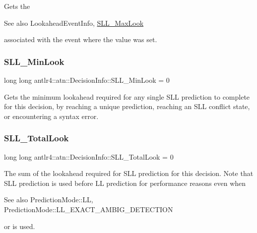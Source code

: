 Gets the \begin{DoxySeeAlso}{See also}
Lookahead\+Event\+Info, \hyperlink{classantlr4_1_1atn_1_1DecisionInfo_a79f953eada792e1239b292a4a2163138}{S\+L\+L\+\_\+\+Max\+Look}


\end{DoxySeeAlso}
associated with the event where the  value was set. \mbox{\label{classantlr4_1_1atn_1_1DecisionInfo_a8ab55352ff7f6a4598f96291377780e8}} 
\subsubsection{\texorpdfstring{S\+L\+L\+\_\+\+Min\+Look}{SLL\_MinLook}}
{\footnotesize\ttfamily long long antlr4\+::atn\+::\+Decision\+Info\+::\+S\+L\+L\+\_\+\+Min\+Look = 0}



Gets the minimum lookahead required for any single S\+LL prediction to complete for this decision, by reaching a unique prediction, reaching an S\+LL conflict state, or encountering a syntax error. 

\mbox{\label{classantlr4_1_1atn_1_1DecisionInfo_a63d0122173acb50fa288e876220cdb90}} 
\subsubsection{\texorpdfstring{S\+L\+L\+\_\+\+Total\+Look}{SLL\_TotalLook}}
{\footnotesize\ttfamily long long antlr4\+::atn\+::\+Decision\+Info\+::\+S\+L\+L\+\_\+\+Total\+Look = 0}



The sum of the lookahead required for S\+LL prediction for this decision. Note that S\+LL prediction is used before LL prediction for performance reasons even when \begin{DoxySeeAlso}{See also}
Prediction\+Mode\+::\+LL, Prediction\+Mode\+::\+L\+L\+\_\+\+E\+X\+A\+C\+T\+\_\+\+A\+M\+B\+I\+G\+\_\+\+D\+E\+T\+E\+C\+T\+I\+ON


\end{DoxySeeAlso}
or  is used. 

